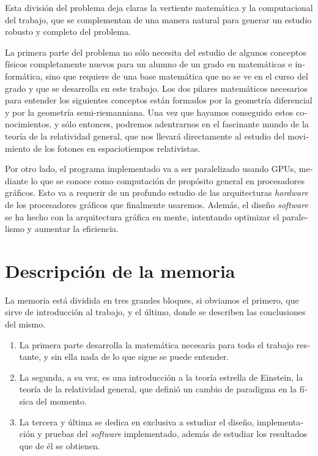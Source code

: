 \begin{otherlanguage}{spanish}
Esta división del problema deja claras la vertiente matemática y la computacional del trabajo, que se complementan de una manera natural para generar un estudio robusto y completo del problema.

La primera parte del problema no sólo necesita del estudio de algunos conceptos físicos completamente nuevos para un alumno de un grado en matemáticas e informática, sino que requiere de una base matemática que no se ve en el curso del grado y que se desarrolla en este trabajo. Los dos pilares matemáticos necesarios para entender los siguientes conceptos están formados por la geometría diferencial y por la geometría semi-riemanniana. Una vez que hayamos conseguido estos conocimientos, y sólo entonces, podremos adentrarnos en el fascinante mundo de la teoría de la relatividad general, que nos llevará directamente al estudio del movimiento de los fotones en espaciotiempos relativistas.

Por otro lado, el programa implementado va a ser paralelizado usando \acp{GPU}, mediante lo que se conoce como computación de propósito general en procesadores gráficos. Esto va a requerir de un profundo estudio de las arquitecturas \emph{hardware} de los procesadores gráficos que finalmente usaremos. Además, el diseño \emph{software} se ha hecho con la arquitectura gráfica en mente, intentando optimizar el paralelismo y aumentar la eficiencia.

\section*{Descripción de la memoria}

La memoria está dividida en tres grandes bloques, si obviamos el primero, que sirve de introducción al trabajo, y el último, donde se describen las conclusiones del mismo.

\begin{enumerate}
	\item La primera parte desarrolla la matemática necesaria para todo el trabajo restante, y sin ella nada de lo que sigue se puede entender.
	\item La segunda, a su vez, es una introducción a la teoría estrella de Einstein, la teoría de la relatividad general, que definió un cambio de paradigma en la física del momento.
	\item La tercera y última se dedica en exclusiva a estudiar el diseño, implementación y pruebas del \emph{software} implementado, además de estudiar los resultados que de él se obtienen.
\end{enumerate}


\end{otherlanguage}
